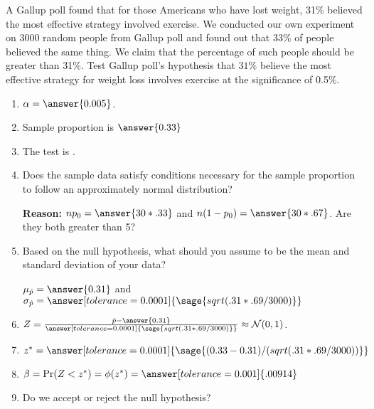 \documentclass{ximera}
\begin{document}
\begin{problem}
A Gallup poll found that for those Americans who have lost weight, 31\% believed the most
effective strategy involved exercise. We conducted our own experiment on 3000 random people from Gallup poll and found out that 33\% of people believed the same thing. We claim that the percentage of such people should be greater than 31\%. Test Gallup poll's hypothesis that $31\%$ believe the most effective strategy for weight loss involves exercise at the significance of 0.5\%.

\begin{explanation}

\begin{enumerate}
    \item $\alpha=\answer{0.005}$.
    \item Sample proportion is $\answer{0.33}$
     \item The test is .
    \item Does the sample data satisfy conditions necessary for the sample proportion to follow an
approximately normal distribution?
\begin{multipleChoice}
\end{multipleChoice}
{\bf Reason:} $np_0=\answer{30*.33}$
and $n(1-p_0)=\answer{30*.67}$. Are they both greater than 5? 
    
    \item Based on the null hypothesis, what should you assume to be the mean and standard deviation of your data? 

$\mu_{\hat p}=\answer{0.31}$ and $\sigma_{\hat p}=\answer[tolerance=0.0001]{\sage{sqrt(.31*.69/3000)}}$
    \item $Z=\frac{\hat p -\answer{0.31}}{\answer[tolerance=0.0001]{\sage{sqrt(.31*.69/3000)}}}\approx \mathcal N(0,1)$.
    \item $z^*=\answer[tolerance=0.0001]{\sage{(0.33 -0.31)/(sqrt(.31*.69/3000))}}$
    \item $\beta=\Pr(Z<z^*)=\phi(z^*)=\answer[tolerance=0.001]{.00914}$
    \item Do we accept or reject the null hypothesis?
    \begin{multipleChoice}
    \end{multipleChoice}
\end{enumerate}
\end{explanation}
\end{problem}
\end{document}

